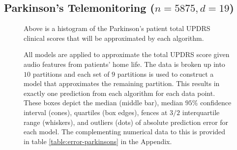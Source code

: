 \documentclass[smallextended,final]{svjour3}       %
\begin{document}
\subsection{Parkinson's Telemonitoring ($n = 5875, d = 19$)}

\begin{figure}
  \centering
  \caption{Above is a histogram of the Parkinson's patient total UPDRS clinical scores that will be approximated by each algorithm.}
  \label{fig:hist-parkinsons}
\end{figure}

\begin{figure}
  \centering
  \caption{All models are applied to approximate the total UPDRS score given audio features from patients' home life. The data is broken up into $10$ partitions and each set of $9$ partitions is used to construct a model that approximates the remaining partition. This results in exactly one prediction from each algorithm for each data point. These boxes depict the median (middle bar), median $95\%$ confidence interval (cones), quartiles (box edges), fences at $3/2$ interquartile range (whiskers), and outliers (dots) of absolute prediction error for each model. The complementing numerical data to this is provided in table \ref{table:error-parkinsons} in the Appendix.}
  \label{fig:error-parkinsons}
\end{figure}
\end{document}
